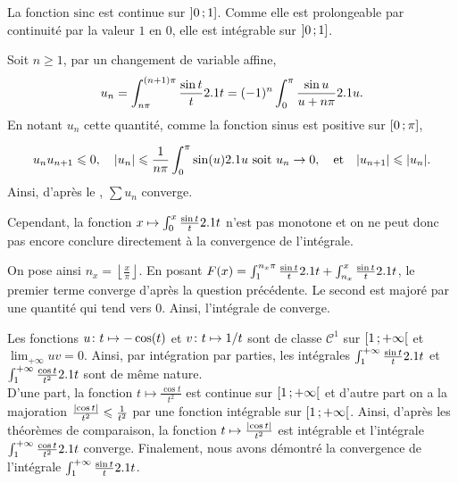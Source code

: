 \begin{solution}
\begin{reponses}
\item La fonction $\mathrm{sinc}$ est continue sur $\interof{0}{1}$. Comme elle est prolongeable par continuité par la valeur $1$ en $0$, elle est intégrable sur $\interof{0}{1}$.

\item Soit $n \geqslant 1$, par un changement de variable affine,
\[
u_n =
\int_{n\pi}^{(n+1)\pi} \frac{\sin t}{t} \d t
= (-1)^n \int_0^\pi \frac{\sin u}{u + n \pi} \d u.
\]
En notant $u_n$ cette quantité, comme la fonction sinus est positive sur $\interff{0}{\pi}$,
\begin{comment}
\item $u_n u_{n+1} \leq 0$,
\item $\abs{u_n} \leq \frac{1}{n\pi} \int_0^\pi \sin(u) \d u$ soit $u_n \to 0$,
\item $\abs{u_{n+1}} \leq \abs{u_n}$.
\end{comment}
\[
u_n u_{n+1} \leqslant 0, \quad \abs{u_n} \leqslant \frac{1}{n\pi} \int_0^\pi \sin(u) \d u \text{ soit } u_n \to 0, \quad \text{et} \quad \abs{u_{n+1}} \leqslant \abs{u_n}.
\]
Ainsi, d'après le , $\sum u_n$ converge.

\medskip

Cependant, la fonction $x \mapsto \int_0^x \frac{\sin t}{t} \d t$ n'est pas monotone et on ne peut donc pas encore conclure directement à la convergence de l'intégrale.

On pose ainsi $n_x = \left\lfloor\frac{x}{\pi}\right\rfloor$. En posant $F(x) = \int_1^{n_x\pi} \frac{\sin t}{t} \d t + \int_{n_x}^x \frac{\sin t}{t} \d t$, le premier terme converge d'après la question précédente. Le second est majoré par une quantité qui tend vers $0$. Ainsi, l'intégrale de  converge.

\item Les fonctions $\fonctionligne[u]{t}{-\cos(t)}$ et $\fonctionligne[v]{t}{1/t}$ sont de classe $\mathscr{C}^1$ sur $\interfo{1}{+\infty}$ et $\lim_{+\infty} u v = 0$. Ainsi, par intégration par parties, les intégrales $\int_1^{+\infty} \frac{\sin t}{t} \d t$ et $\int_1^{+\infty} \frac{\cos t}{t^2} \d t$ sont de même nature. \\
D'une part, la fonction $t \mapsto \frac{\cos t}{t^2}$ est continue sur $\interfo{1}{+\infty}$ et d'autre part on a la majoration $\frac{\abs{\cos t}}{t^2} \leqslant \frac{1}{t^2}$ par une fonction intégrable sur $\interfo{1}{+\infty}$. Ainsi, d'après les théorèmes de comparaison, la fonction $t \mapsto \frac{\abs{\cos t}}{t^2}$ est intégrable et l'intégrale $\int_1^{+\infty} \frac{\cos t}{t^2} \d t$ converge. Finalement, nous avons démontré la convergence de l'intégrale $\int_1^{+\infty} \frac{\sin t}{t} \d t$.
\end{reponses}
\end{solution}

